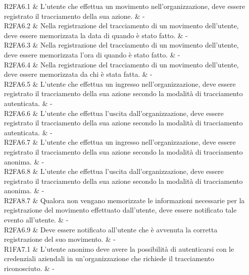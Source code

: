 R2FA6.1 & L’utente che effettua un movimento nell’organizzazione, deve essere registrato il tracciamento della sua azione.  & - \\

R2FA6.2 & Nella registrazione del tracciamento di un movimento dell’utente, deve essere memorizzata la data di quando è stato fatto.  & - \\

R2FA6.3 & Nella registrazione del tracciamento di un movimento dell’utente, deve essere memorizzata l’ora di quando è stato fatto.  & - \\

R2FA6.4 & Nella registrazione del tracciamento di un movimento dell’utente, deve essere memorizzata da chi è stata fatta.  & - \\

R2FA6.5 & L’utente che effettua un ingresso nell’organizzazione, deve essere registrato il tracciamento della sua azione secondo la modalità di tracciamento autenticata.  & - \\

R2FA6.6 & L’utente che effettua l’uscita dall’organizzazione, deve essere registrato il tracciamento della sua azione secondo la modalità di tracciamento autenticata.  & - \\

R2FA6.7 & L’utente che effettua un ingresso nell’organizzazione, deve essere registrato il tracciamento della sua azione secondo la modalità di tracciamento anonima.  & - \\

R2FA6.8 & L’utente che effettua l’uscita dall’organizzazione, deve essere registrato il tracciamento della sua azione secondo la modalità di tracciamento anonima.  & - \\

R2FA8.7 & Qualora non vengano memorizzate le informazioni necessarie per la registrazione del movimento effettuato dall’utente, deve essere notificato tale evento all’utente.  & - \\

R2FA6.9 & Deve essere notificato all’utente che è avvenuta la corretta registrazione del suo movimento.  & - \\


R1FA7.1 & L'utente anonimo deve avere la possibilità di autenticarsi con le credenziali aziendali in un'organizzazione che richiede il tracciamento riconosciuto.  & - \\

